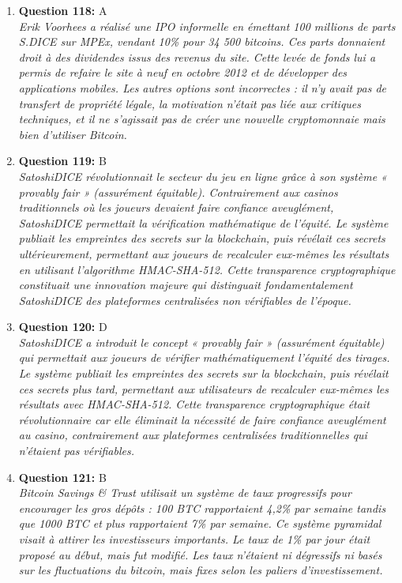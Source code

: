 \documentclass[12pt,a4paper]{article}
\begin{document}
\begin{enumerate}
\item \textbf{Question 118:} A
\\ \textit{Erik Voorhees a réalisé une IPO informelle en émettant 100 millions de parts S.DICE sur MPEx, vendant 10\% pour 34 500 bitcoins. Ces parts donnaient droit à des dividendes issus des revenus du site. Cette levée de fonds lui a permis de refaire le site à neuf en octobre 2012 et de développer des applications mobiles. Les autres options sont incorrectes : il n'y avait pas de transfert de propriété légale, la motivation n'était pas liée aux critiques techniques, et il ne s'agissait pas de créer une nouvelle cryptomonnaie mais bien d'utiliser Bitcoin.}

\item \textbf{Question 119:} B
\\ \textit{SatoshiDICE révolutionnait le secteur du jeu en ligne grâce à son système « provably fair » (assurément équitable). Contrairement aux casinos traditionnels où les joueurs devaient faire confiance aveuglément, SatoshiDICE permettait la vérification mathématique de l'équité. Le système publiait les empreintes des secrets sur la blockchain, puis révélait ces secrets ultérieurement, permettant aux joueurs de recalculer eux-mêmes les résultats en utilisant l'algorithme HMAC-SHA-512. Cette transparence cryptographique constituait une innovation majeure qui distinguait fondamentalement SatoshiDICE des plateformes centralisées non vérifiables de l'époque.}

\item \textbf{Question 120:} D
\\ \textit{SatoshiDICE a introduit le concept « provably fair » (assurément équitable) qui permettait aux joueurs de vérifier mathématiquement l'équité des tirages. Le système publiait les empreintes des secrets sur la blockchain, puis révélait ces secrets plus tard, permettant aux utilisateurs de recalculer eux-mêmes les résultats avec HMAC-SHA-512. Cette transparence cryptographique était révolutionnaire car elle éliminait la nécessité de faire confiance aveuglément au casino, contrairement aux plateformes centralisées traditionnelles qui n'étaient pas vérifiables.}

\item \textbf{Question 121:} B
\\ \textit{Bitcoin Savings & Trust utilisait un système de taux progressifs pour encourager les gros dépôts : 100 BTC rapportaient 4,2\% par semaine tandis que 1000 BTC et plus rapportaient 7\% par semaine. Ce système pyramidal visait à attirer les investisseurs importants. Le taux de 1\% par jour était proposé au début, mais fut modifié. Les taux n'étaient ni dégressifs ni basés sur les fluctuations du bitcoin, mais fixes selon les paliers d'investissement.}


\end{enumerate}
\end{document}
